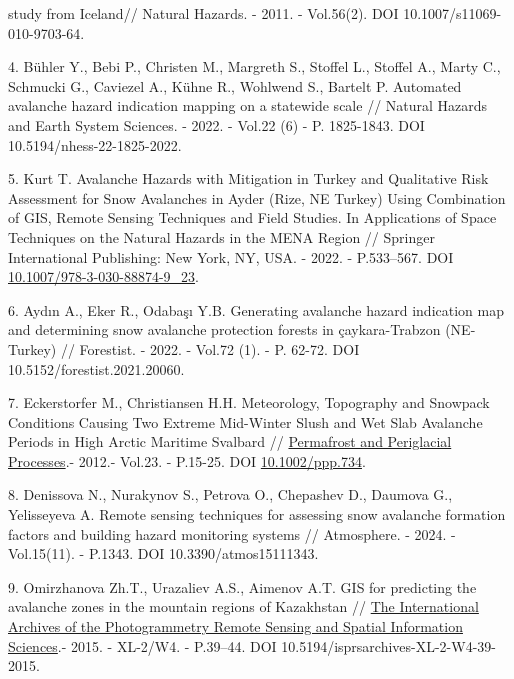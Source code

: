 study from Iceland// Natural Hazards. - 2011. - Vol.56(2). DOI
10.1007/s11069-010-9703-64.

4. Bühler Y., Bebi P., Christen M., Margreth S., Stoffel L., Stoffel A.,
Marty C., Schmucki G., Caviezel A., Kühne R., Wohlwend S., Bartelt P.
Automated avalanche hazard indication mapping on a statewide scale //
Natural Hazards and Earth System Sciences. - 2022. - Vol.22 (6) - P.
1825-1843. DOI 10.5194/nhess-22-1825-2022.

5. Kurt T. Avalanche Hazards with Mitigation in Turkey and Qualitative
Risk Assessment for Snow Avalanches in Ayder (Rize, NE Turkey) Using
Combination of GIS, Remote Sensing Techniques and Field Studies. In
Applications of Space Techniques on the Natural Hazards in the MENA
Region // Springer International Publishing: New York, NY, USA. - 2022.
- P.533--567. DOI
\href{http://dx.doi.org/10.1007/978-3-030-88874-9_23}{10.1007/978-3-030-88874-9\_23}.

6. Aydın A., Eker R., Odabaşı Y.B. Generating avalanche hazard
indication map and determining snow avalanche protection forests in
çaykara-Trabzon (NE-Turkey) // Forestist. - 2022. - Vol.72 (1). - P.
62-72. DOI 10.5152/forestist.2021.20060.

7. Eckerstorfer M., Christiansen H.H. Meteorology, Topography and
Snowpack Conditions Causing Two Extreme Mid-Winter Slush and Wet Slab
Avalanche Periods in High Arctic Maritime Svalbard //
\href{https://www.researchgate.net/journal/Permafrost-and-Periglacial-Processes-1099-1530?_tp=eyJjb250ZXh0Ijp7ImZpcnN0UGFnZSI6InB1YmxpY2F0aW9uIiwicGFnZSI6InB1YmxpY2F0aW9uIn19}{Permafrost
and Periglacial Processes}.- 2012.- Vol.23. - P.15-25. DOI
\href{http://dx.doi.org/10.1002/ppp.734}{10.1002/ppp.734}.

8. Denissova N., Nurakynov S., Petrova O., Chepashev D., Daumova G.,
Yelisseyeva A. Remote sensing techniques for assessing snow avalanche
formation factors and building hazard monitoring systems // Atmosphere.
- 2024. - Vol.15(11). - P.1343. DOI 10.3390/atmos15111343.

9. Omirzhanova Zh.T., Urazaliev A.S., Aimenov A.T. GIS for predicting
the avalanche zones in the mountain regions of Kazakhstan //
\href{https://www.researchgate.net/journal/The-International-Archives-of-the-Photogrammetry-Remote-Sensing-and-Spatial-Information-Sciences-2194-9034?_tp=eyJjb250ZXh0Ijp7ImZpcnN0UGFnZSI6InB1YmxpY2F0aW9uIiwicGFnZSI6InB1YmxpY2F0aW9uIn19}{The
International Archives of the Photogrammetry Remote Sensing and Spatial
Information Sciences}.- 2015. - XL-2/W4. - P.39--44. DOI
10.5194/isprsarchives-XL-2-W4-39-2015.

